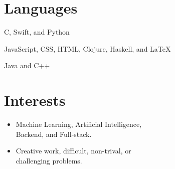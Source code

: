 \documentclass{tccv}
\begin{document}
\section{Languages}

\begin{factlist}

  {C, Swift, and Python}

  {JavaScript, CSS, HTML, Clojure, Haskell, and LaTeX}

  {Java and C++}

\end{factlist}

\section{Interests}
\begin{itemize}
\item Machine Learning, Artificial Intelligence, \\
  Backend, and Full-stack.
\item Creative work, difficult, non-trival, or \\
  challenging problems.
\end{itemize}
\end{document}
